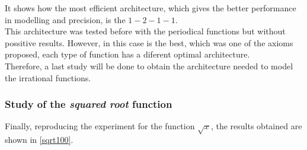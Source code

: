 \documentclass[a4paper, 11pt]{article}
\begin{document}
It shows how the most efficient architecture, which gives the better performance in modelling and precision, is the $1-2-1-1$.\\
This architecture was tested before with the periodical functions but without possitive results. However, in this case is the best, which was one of the axioms proposed, each type of function has a diferent optimal architecture.\\
Therefore, a last study will be done to obtain the architecture needed to model the irrational functions.
\newpage

\subsubsection{Study of the \textit{squared root} function}
Finally, reproducing the experiment for the function $\sqrt{x}$, the results obtained are shown in \ref{sqrt100}.
\end{document}
